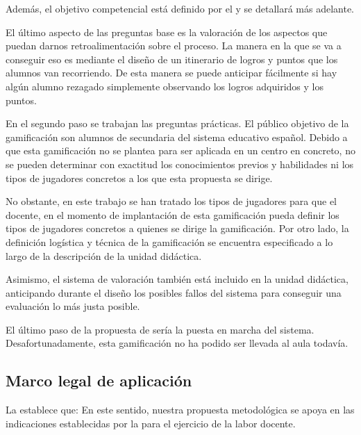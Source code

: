 Además, el objetivo competencial está definido por el \bocm y se detallará más adelante.

El último aspecto de las preguntas base es la valoración de los aspectos que puedan darnos retroalimentación sobre el proceso.
%
La manera en la que se va a conseguir eso es mediante el diseño de un itinerario de logros y puntos que los alumnos van recorriendo.
%
De esta manera se puede anticipar fácilmente si hay algún alumno rezagado simplemente observando los logros adquiridos y los puntos.
%

En el segundo paso se trabajan las preguntas prácticas.
%
El público objetivo de la gamificación son alumnos de secundaria del sistema educativo español. 
%
Debido a que esta gamificación no se plantea para ser aplicada en un centro en concreto, no se pueden determinar con exactitud los conocimientos previos y habilidades ni los tipos de jugadores concretos a los que esta propuesta se dirige.

No obstante, en este trabajo se han tratado los tipos de jugadores para que el docente, en el momento de implantación de esta gamificación pueda definir los tipos de jugadores concretos a quienes se dirige la gamificación.
%
Por otro lado, la definición logística y técnica de la gamificación se encuentra especificado a lo largo de la descripción de la unidad didáctica. 

Asimismo, el sistema de valoración también está incluido en la unidad didáctica, anticipando durante el diseño los posibles fallos del sistema para conseguir una evaluación lo más justa posible.

El último paso de la propuesta de \cite{kapp2013gamification} sería la puesta en marcha del sistema. 
%
Desafortunadamente, esta gamificación no ha podido ser llevada al aula todavía.

\subsection{Marco legal de aplicación}

La \lomce establece que:  
%
En este sentido, nuestra propuesta metodológica se apoya en las indicaciones establecidas por la \lomce para el ejercicio de la labor docente.

